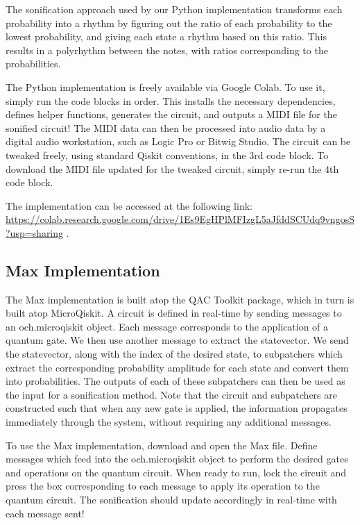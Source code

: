 \documentclass[10pt,twocolumn]{article}
\begin{document}
The sonification approach used by our Python implementation transforms each probability into a rhythm by figuring out the ratio of each probability to the lowest probability, and giving each state a rhythm based on this ratio. This results in a polyrhythm between the notes, with ratios corresponding to the probabilities. 

The Python implementation is freely available via Google Colab\cite{googlecolab}. To use it, simply run the code blocks in order. This installs the necessary dependencies, defines helper functions, generates the circuit, and outputs a MIDI\cite{midi1spec} file for the sonified circuit! The MIDI data can then be processed into audio data by a digital audio workstation, such as Logic Pro\cite{logicpro} or Bitwig Studio\cite{bitwigstudio}. The circuit can be tweaked freely, using standard Qiskit conventions, in the 3rd code block. To download the MIDI file updated for the tweaked circuit, simply re-run the 4th code block.

The implementation can be accessed at the following link: \url{https://colab.research.google.com/drive/1Es9EgHPlMFIzgL5aJfddSCUdq9vngosS?usp=sharing} .

\subsection{Max Implementation}

The Max implementation is built atop the QAC Toolkit\cite{Hamido_2022} package, which in turn is built atop MicroQiskit\cite{microqiskit}. A circuit is defined in real-time by sending messages to an och.microqiskit object. Each message corresponds to the application of a quantum gate. We then use another message to extract the statevector. We send the statevector, along with the index of the desired state, to subpatchers which extract the corresponding probability amplitude for each state and convert them into probabilities. The outputs of each of these subpatchers can then be used as the input for a sonification method. Note that the circuit and subpatchers are constructed such that when any new gate is applied, the information propagates immediately through the system, without requiring any additional messages.

To use the Max implementation, download and open the Max file. Define messages which feed into the och.microqiskit object to perform the desired gates and operations on the quantum circuit. When ready to run, lock the circuit and press the box corresponding to each message to apply its operation to the quantum circuit. The sonification should update accordingly in real-time with each message sent!
\end{document}
